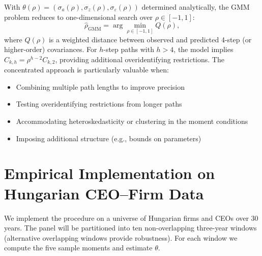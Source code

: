 \documentclass[11pt]{article}
\begin{document}
With $\theta(\rho) = (\sigma_a(\rho), \sigma_z(\rho), \sigma_\varepsilon(\rho))$ determined analytically, the GMM problem reduces to one-dimensional search over $\rho\in[-1,1]$:
\begin{equation}
\label{eq:concentrated-gmm}
 \widehat\rho_{\text{GMM}} = \arg\min_{\rho\in[-1,1]} Q(\rho),
\end{equation}
where $Q(\rho)$ is a weighted distance between observed and predicted 4-step (or higher-order) covariances. For $h$-step paths with $h>4$, the model implies $C_{k,h} = \rho^{h-2} C_{k,2}$, providing additional overidentifying restrictions. The concentrated approach is particularly valuable when:
\begin{itemize}
 \item Combining multiple path lengths to improve precision
 \item Testing overidentifying restrictions from longer paths
 \item Accommodating heteroskedasticity or clustering in the moment conditions
 \item Imposing additional structure (e.g., bounds on parameters)
\end{itemize}

\section{Empirical Implementation on Hungarian CEO--Firm Data}
\label{sec:implementation}
We implement the procedure on a universe of Hungarian firms and CEOs over 30 years. The panel will be partitioned into ten non-overlapping three-year windows (alternative overlapping windows provide robustness). For each window we compute the five sample moments and estimate $\theta$.
\end{document}
